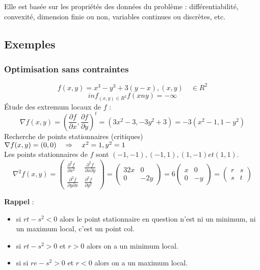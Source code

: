 	Elle est basée sur les propriétés des données du problème : différentiabilité, convexité, dimension finie ou non, variables continues ou discrètes, etc.
	
	
	\subsection{Exemples}
	
		\subsubsection{Optimisation sans contraintes}
		
	\[f(x, y) = x^3 - y^3 + 3(y-x), (x, y) \quad\in R^2\]
	\[inf_{(x, y) \in R^2} f(xn y) = -\infty \]
	Étude des extremum locaux de $f$ :
	\[\nabla f(x, y) = (\frac{\partial f}{\partial x}, \frac{\partial f}{\partial y})^t = (3x^2-3, -3y^2 +3)=-3(x^2-1 , 1-y^2)\]
	Recherche de points stationnaires (critiques) $\nabla f(x, y) = ( 0, 0) \quad\Rightarrow\quad x^2 = 1 , y^2 = 1$ \\
	Les points stationnaires de $f$ sont $(-1, -1), (-1, 1), (1, -1) et (1, 1)$.
	\[\nabla^2 f(x, y) = \begin{pmatrix} \frac{\partial^2 f}{\partial x^2} &\frac{\partial^2 f}{\partial x \partial y} \\ \frac{\partial^2 f}{\partial y \partial x} & \frac{\partial^2 f}{\partial y^2} \end{pmatrix} 
	= \begin{pmatrix} 32x & 0 \\ 0 & -2y \end{pmatrix}
	= 6\begin{pmatrix} x & 0 \\ 0 & -y\end{pmatrix} 
	= \begin{pmatrix} r & s \\ s & t\end{pmatrix}\]

	
	\textbf{Rappel} :
	\begin{itemize}
		\item si $rt-s^2 <0$ alors le point stationnaire en question n'est ni un minimum, ni un maximum local, c'est un point \og col\fg.
		\item si $rt -s^2 >0$ et $r>0$ alors on a un minimum local. 
		\item si si $re -s^2 >0$ et $r<0$ alors on a un maximum local.
	\end{itemize}
	
